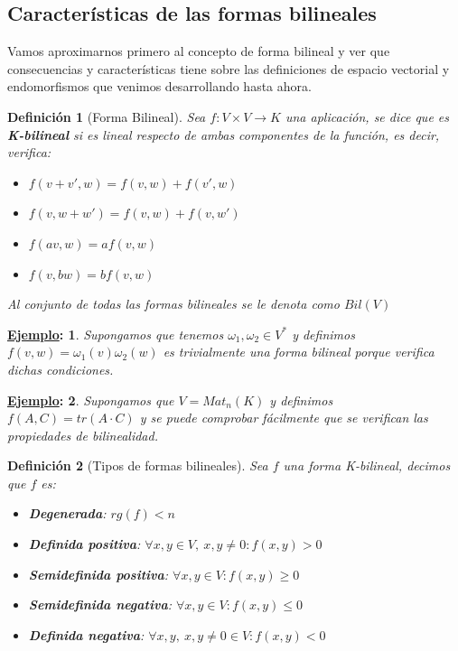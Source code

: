 \documentclass[10pt,a4paper,openright]{book}
\theoremstyle{break}
\newtheorem*{defi}{Definición}
\newtheorem*{ej}{\underline{Ejemplo}:}
\begin{document}
\subsection{Características de las formas bilineales}
Vamos aproximarnos primero al concepto de forma bilineal y ver que consecuencias y características tiene sobre las definiciones de espacio vectorial y endomorfismos que venimos desarrollando hasta ahora.

\begin{defi}[Forma Bilineal]
Sea $f: V\times V\rightarrow K$ una aplicación, se dice que es \textbf{K-bilineal} si es lineal respecto de ambas componentes de la función, es decir, verifica:
\begin{itemize}
\item $f(v+v',w) = f(v,w)+f(v',w)$
\item $f(v, w+w') = f(v,w)+f(v,w')$
\item $f(av, w)= a f(v,w)$
\item $f(v,bw)=bf(v,w)$
\end{itemize}
Al conjunto de todas las formas bilineales se le denota como $Bil(V)$
\end{defi}

\begin{ej}
Supongamos que tenemos $\omega_1, \omega_2\in V^*$ y definimos $f(v,w)=\omega_1(v)\omega_2(w)$ es trivialmente una forma bilineal porque verifica dichas condiciones.
\end{ej}

\begin{ej}
Supongamos que $V=Mat_n(K)$ y definimos $f(A,C)=tr(A\cdot C)$ y se puede comprobar fácilmente que se verifican las propiedades de bilinealidad.
\end{ej}

\begin{defi}[Tipos de formas bilineales]
Sea $f$ una forma K-bilineal, decimos que $f$ es:
\begin{itemize}
\item \textbf{Degenerada}: $rg(f)< n$
\item \textbf{Definida positiva}: $\forall x,y \in V, \ x,y\neq 0: f(x,y) > 0$
\item \textbf{Semidefinida positiva}: $\forall x,y \in V: f(x,y) \geq 0$
\item \textbf{Semidefinida negativa}: $ \forall x,y \in V: f(x,y) \leq 0$
\item \textbf{Definida negativa}: $ \forall x,y, \ x,y\neq 0 \in V: f(x,y) < 0$
\end{itemize}
\end{defi}
\end{document}
